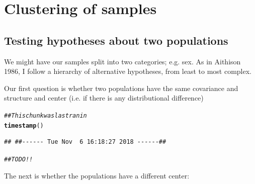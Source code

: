 \documentclass{article}\usepackage[]{graphicx}\usepackage[]{color}
\makeatletter
\newcommand{\hlcom}[1]{\textcolor[rgb]{0.678,0.584,0.686}{\textit{#1}}}%
\newcommand{\hlstd}[1]{\textcolor[rgb]{0.345,0.345,0.345}{#1}}%
\newcommand{\hlkwd}[1]{\textcolor[rgb]{0.737,0.353,0.396}{\textbf{#1}}}%
\newenvironment{kframe}{%
 \def\at@end@of@kframe{}%
 \ifinner\ifhmode%
  \def\at@end@of@kframe{\end{minipage}}%
  \begin{minipage}{\columnwidth}%
 \fi\fi%
 \def\FrameCommand##1{\hskip\@totalleftmargin \hskip-\fboxsep
 \colorbox{shadecolor}{##1}\hskip-\fboxsep
     \hskip-\linewidth \hskip-\@totalleftmargin \hskip\columnwidth}%
 \MakeFramed {\advance\hsize-\width
   \@totalleftmargin\z@ \linewidth\hsize
   \@setminipage}}%
 {\par\unskip\endMakeFramed%
 \at@end@of@kframe}
\newenvironment{knitrout}{}{} %
\makeatother
\begin{document}
\section{Clustering of samples}



\clearpage

\subsection{Testing hypotheses about two populations}
We might have our samples split into two categories; e.g. sex. As in Aithison 1986\cite{}, I follow a hierarchy of alternative hypotheses, from least to most complex.

Our first question is whether two populations have the same covariance and structure and center (i.e. if there is any distributional difference)

\begin{knitrout}
\color{fgcolor}\begin{kframe}
\begin{alltt}
\hlcom{## This chunk was last ran in}
\hlkwd{timestamp}\hlstd{()}
\end{alltt}
\begin{verbatim}
## ##------ Tue Nov  6 16:18:27 2018 ------##
\end{verbatim}
\begin{alltt}
\hlcom{##TODO!!}
\end{alltt}
\end{kframe}
\end{knitrout}

The next is whether the populations have a different center:
\end{document}
